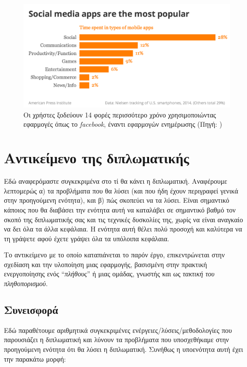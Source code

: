\begin{figure}[!t]
	\includegraphics[scale=0.3]{figures/social-media-usage.png}
	\centering
	\caption{Οι χρήστες ξοδεύουν 14 φορές περισσότερο χρόνο χρησιμοποιώντας εφαρμογές όπως το  \textit{facebook}, έναντι εφαρμογών ενημέρωσης  (Πηγή: \cite{[AMP+14]})}
	\label{socialmediausage}
\end{figure}



\section{Αντικείμενο της διπλωματικής}

Εδώ αναφερόμαστε συγκεκριμένα στο τί θα κάνει η διπλωματική. Αναφέρουμε λεπτομερώς α) τα προβλήματα που θα λύσει (και που ήδη έχουν περιγραφεί γενικά στην προηγούμενη ενότητα), και β) πώς σκοπεύει να τα λύσει. 
Είναι σημαντικό κάποιος που θα διαβάσει την ενότητα αυτή να καταλάβει σε σημαντικό βαθμό τον σκοπό της διπλωματικής σας και τις τεχνικές δυσκολίες της, χωρίς να είναι αναγκαίο να δει όλα τα άλλα κεφάλαια. Η ενότητα αυτή θέλει πολύ προσοχή και καλύτερα να τη γράψετε αφού έχετε γράψει όλα τα υπόλοιπα κεφάλαια.

Το αντικείμενο με το οποίο καταπιάνεται το παρόν έργο, επικεντρώνεται στην σχεδίαση και την υλοποίηση μιας εφαρμογής, βασισμένη στην πρακτική ενεργοποίησης ενός ``\textit{πλήθους}'' ή μιας ομάδας, γνωστής και ως \textit{τακτική του πληθοπορισμού}. 

\subsection{Συνεισφορά}
Εδώ παραθέτουμε αριθμητικά συγκεκριμένες ενέργειες/λύσεις/μεθοδολογίες που παρουσιάζει η διπλωματική και λύνουν τα προβλήματα που υποσχεθήκαμε στην προηγούμενη ενότητα ότι θα λύσει η διπλωματική. Συνήθως η υποενότητα αυτή έχει την παρακάτω μορφή:

